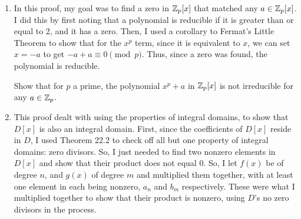 \begin{enumerate}[label=\textbf{\arabic*.}]
    \item In this proof, my goal was to find a zero in \(\mathbb{Z}_{p}[x]\) that matched any \(a \in \mathbb{Z}_{p}[x]\). I did this by first noting that a polynomial is reducible if it is greater than or equal to 2, and it has a zero. Then, I used a corollary to Fermat's Little Theorem to show that for the \(x^{p}\) term, since it is equivalent to \(x\), we can set \(x = -a\) to get \(-a + a \equiv 0 \pmod{p}\). Thus, since a zero was found, the polynomial is reducible. 

    \begin{problem}
        Show that for \(p\) a prime, the polynomial \(x^{p} + a\) in \(\mathbb{Z}_{p} [x]\) is not irreducible for any \(a \in \mathbb{Z}_{p}\).
    \end{problem}

    \item This proof dealt with using the properties of integral domains, to show that \(D[x]\) is also an integral domain. First, since the coefficients of \(D[x]\) reside in \(D\), I used Theorem 22.2 to check off all but one property of integral domains: zero divisors. So, I just needed to find two nonzero elements in \(D[x]\) and show that their product does not equal 0. So, I let \(f(x)\) be of degree \(n\), and \(g(x)\) of degree \(m\) and multiplied them together, with at least one element in each being nonzero, \(a_{n}\) and \(b_{m}\) respectively. These were what I multiplied together to show that their product is nonzero, using \(D\)'s no zero divisors in the process. 


\end{enumerate}
